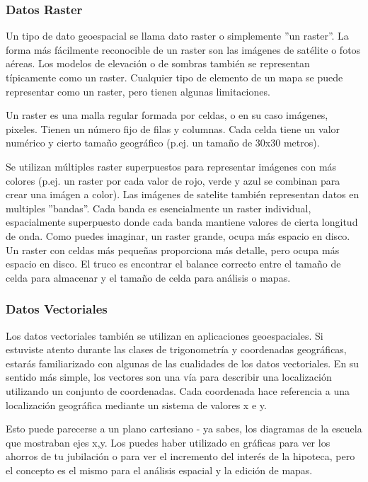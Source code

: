 \subsubsection{Datos Raster}\label{label_rasterdata}

Un tipo de dato geoespacial se llama dato raster o simplemente ''un raster''. 
La forma más fácilmente reconocible de un raster son las imágenes de satélite
o fotos aéreas. Los modelos de elevación o de sombras también se representan 
típicamente como un raster. Cualquier tipo de elemento de un mapa se puede 
representar como un raster, pero tienen algunas limitaciones.

Un raster es una malla regular formada por celdas, o en su caso imágenes, 
pixeles. Tienen un número fijo de filas y columnas. Cada celda tiene un valor 
numérico y cierto tamaño geográfico (p.ej. un tamaño de 30x30 metros).

Se utilizan múltiples raster superpuestos para representar imágenes con más 
colores (p.ej. un raster por cada valor de rojo, verde y azul se combinan para 
crear una imágen a color). Las imágenes de satelite también representan datos 
en multiples ''bandas''. Cada banda es esencialmente un raster individual,
espacialmente superpuesto donde cada banda mantiene valores de cierta longitud
de onda. Como puedes imaginar, un raster grande, ocupa más espacio en disco. 
Un raster con celdas más pequeñas proporciona más detalle, pero ocupa más 
espacio en disco. El truco es encontrar el balance correcto entre el tamaño 
de celda para almacenar y el tamaño de celda para análisis o mapas.

\subsubsection{Datos Vectoriales}\label{label_vectordata}

Los datos vectoriales también se utilizan en aplicaciones geoespaciales. 
Si estuviste atento durante las clases de trigonometría y coordenadas 
geográficas, estarás familiarizado con algunas de las cualidades de los datos 
vectoriales. En su sentido más simple, los vectores son una vía para describir 
una localización utilizando un conjunto de coordenadas. Cada coordenada hace 
referencia a una localización geográfica mediante un sistema de valores x e y.

Esto puede parecerse a un plano cartesiano - ya sabes, los diagramas de la 
escuela que mostraban ejes x,y. Los puedes haber utilizado en gráficas para 
ver los ahorros de tu jubilación o para ver el incremento del interés de la 
hipoteca, pero el concepto es el mismo para el análisis espacial y la edición 
de mapas.

